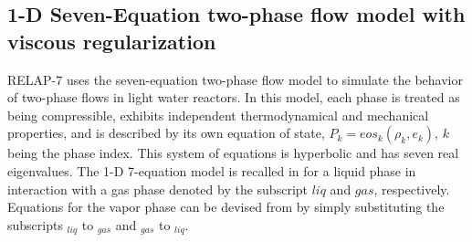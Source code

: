 \documentclass{inputs/mc2015}
\begin{document}
\subsection{1-D Seven-Equation two-phase flow model with viscous regularization}\label{sec:two-phase-model}
%
RELAP-7 \cite{Berry_Peterson_2014} uses the seven-equation two-phase flow model \cite{SEM} to simulate the behavior of two-phase flows in light water reactors. In this model, each phase is treated as being compressible, exhibits independent thermodynamical and mechanical properties, and is described by its own equation of state, $P_k = eos_k(\rho_k,e_k)$, $k$ being the phase index. This system of equations is hyperbolic and has seven real eigenvalues. The 1-D 7-equation model is recalled in  for a liquid phase in interaction with a gas phase denoted by the subscript $liq$ and $gas$, respectively. Equations for the vapor phase can be devised from  by simply substituting the subscripts $_{liq}$ to $_{gas}$ and $_{gas}$ to $_{liq}$.
%
%
\end{document}
